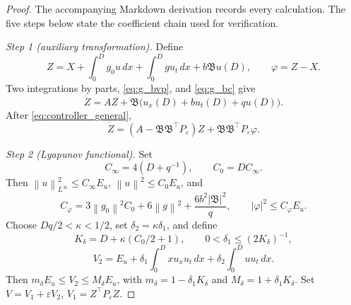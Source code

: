 \documentclass[journal]{IEEEtran}
\newcommand{\eps}{\varepsilon}
\newcommand{\Bcal}{\mathfrak B}
\newcommand{\norm}[1]{\left\|#1\right\|}
\newcommand{\abs}[1]{\left|#1\right|}
\begin{document}
\begin{proof}
The accompanying Markdown derivation records every calculation. The five steps below state the coefficient chain used for verification.

\emph{Step 1 (auxiliary transformation).} Define
\begin{equation}
 Z=X+\int_0^D g_0u\,dx+\int_0^D gu_t\,dx+b\Bcal u(D),\qquad \varphi=Z-X. \label{eq:Z_general}
\end{equation}
Two integrations by parts, \eqref{eq:g_bvp}, and \eqref{eq:g_bc} give
\begin{equation}
 \dot Z=AZ+\Bcal\big(u_x(D)+b u_t(D)+q u(D)\big). \label{eq:Z_target}
\end{equation}
After \eqref{eq:controller_general},
\begin{equation}
 \dot Z=(A-\Bcal\Bcal^\top P_\eps)Z+\Bcal\Bcal^\top P_\eps\varphi. \label{eq:Z_closed}
\end{equation}

\emph{Step 2 (Lyapunov functional).} Set
\begin{equation}
 C_\infty=4(D+q^{-1}),\qquad C_0=DC_\infty. \label{eq:C_infty_C0}
\end{equation}
Then \(\norm{u}_{L^\infty}^2\leq C_\infty E_u\), \(\norm{u}^2\leq C_0E_u\), and
\begin{equation}
 C_\varphi=3\norm{g_0}^{2}C_0+6\norm{g}^{2}
       +\frac{6b^2\abs{\Bcal}^{2}}{q},\qquad
 \abs{\varphi}^2\leq C_\varphi E_u. \label{eq:C_phi}
\end{equation}
Choose \(Dq/2<\kappa<1/2\), set \(\delta_2=\kappa\delta_1\), and define
\begin{equation}
 K_\delta=D+\kappa(C_0/2+1),\qquad
 0<\delta_1\leq(2K_\delta)^{-1},
 \end{equation}
\begin{equation}
 V_2=E_u+\delta_1\int_0^D xu_xu_t\,dx
       +\delta_2\int_0^D uu_t\,dx. \label{eq:V2_general}
\end{equation}
Then \(m_\delta E_u\leq V_2\leq M_\delta E_u\), with \(m_\delta=1-\delta_1K_\delta\) and \(M_\delta=1+\delta_1K_\delta\). Set \(V=V_1+\eps V_2\), \(V_1=Z^\top P_\eps Z\).


\end{proof}
\end{document}
